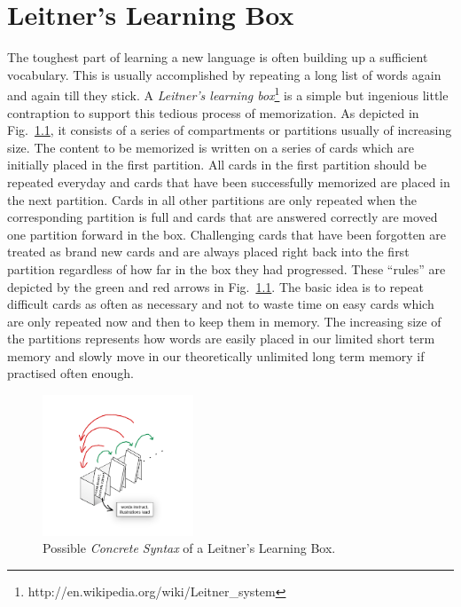 \chapter{Leitner's Learning Box} 
\label{chap:membox}

The toughest part of learning a new language  is often building up a sufficient vocabulary.
This is usually accomplished by repeating a long list of words again and again till they stick.
A \emph{Leitner's learning box}\footnote{http://en.wikipedia.org/wiki/Leitner\_system} is a simple but ingenious little contraption to support this tedious process of memorization.
As depicted in Fig.~\ref{fig:membox_illustration}, it consists of a series of compartments or partitions usually of increasing size.  
The content to be memorized is written on a series of cards  which are initially placed in the first partition.
All cards in the first  partition should be repeated everyday and cards that have been successfully memorized are placed in the next partition.
Cards in all other partitions are only repeated when the corresponding partition is full and cards that are  answered correctly are moved one partition forward in the box.  
Challenging  cards that have been forgotten are treated as brand new cards and are always  placed right back into the first partition regardless of how far in the box they  had progressed.
These ``rules'' are depicted by the green and red arrows in  Fig.~\ref{fig:membox_illustration}.
The basic idea is to repeat difficult cards as often as necessary and not to waste time on easy cards which
are only repeated now and then to keep them in memory.
The increasing size of the partitions represents how words are easily placed in our limited short term memory and slowly move in our theoretically unlimited long term memory if practised often enough.
 
\begin{figure}[htp]
\begin{center}
  \includegraphics[width=0.4\textwidth]{pics/installationAndSetup/membox_illustration}
  \caption[]{Possible \emph{Concrete Syntax} of a Leitner's Learning Box.}
  \label{fig:membox_illustration}
\end{center}
\end{figure}

